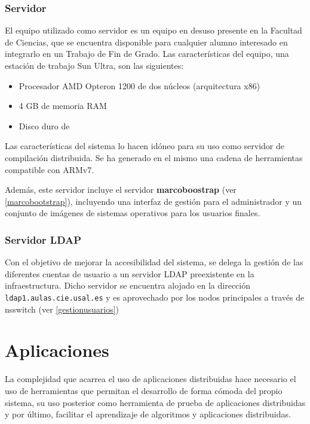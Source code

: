 \subsubsection{Servidor}

El equipo utilizado como servidor es un equipo en desuso presente en la Facultad de Ciencias, que se encuentra disponible para cualquier alumno interesado en integrarlo en un Trabajo de Fin de Grado. Las características del equipo, una estación de trabajo Sun Ultra, son las siguientes:

\begin{itemize}
	\item Procesador AMD Opteron 1200 de dos núcleos (arquitectura x86)%
	\item 4 GB de memoria RAM
	\item Disco duro de %
\end{itemize}
\citationneeded[Prestaciones]

Las características del sistema lo hacen idóneo para su uso como servidor de compilación distribuida. Se ha generado en el mismo una cadena de herramientas compatible con ARMv7.%

Además, este servidor incluye el servidor \textbf{marcoboostrap} (ver \ref{marcobootstrap}), incluyendo una interfaz de gestión para el administrador y un conjunto de imágenes de sistemas operativos para los usuarios finales.

\subsubsection{Servidor LDAP}

Con el objetivo de mejorar la accesibilidad del sistema, se delega la gestión de las diferentes cuentas de usuario a un servidor LDAP preexistente en la infraestructura. Dicho servidor se encuentra alojado en la dirección \texttt{ldap1.aulas.cie.usal.es} y es aprovechado por los nodos principales a través de nsswitch (ver \ref{gestionusuarios}) 


\section{Aplicaciones}

La complejidad que acarrea el uso de aplicaciones distribuidas hace necesario el uso de herramientas que permitan el desarrollo de forma cómoda del propio sistema, su uso posterior como herramienta de prueba de aplicaciones distribuidas y por último, facilitar el aprendizaje de algoritmos y aplicaciones distribuidas.

